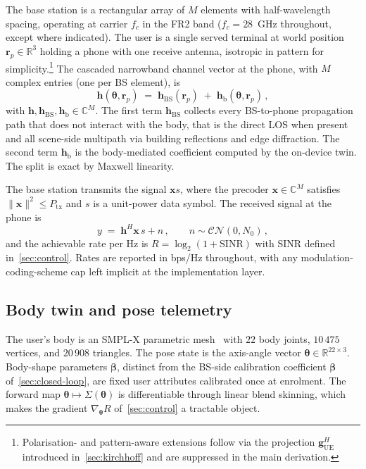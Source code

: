 \documentclass[journal,twocolumn,10pt]{IEEEtran}
\theoremstyle{plain}
\theoremstyle{definition}
\theoremstyle{remark}
\newcommand{\rr}{\mathbf{r}}
\newcommand{\xx}{\mathbf{x}}
\newcommand{\hh}{\bm{h}}
\newcommand{\thetab}{\bm{\theta}}
\newcommand{\betab}{\bm{\beta}}
\newcommand{\hBS}{\bm{h}_{\mathrm{BS}}}
\newcommand{\hbody}{\bm{h}_{\mathrm{b}}}
\newcommand{\Complex}{\mathbb{C}}
\newcommand{\Reals}{\mathbb{R}}
\begin{document}
The base station is a rectangular array of $M$ elements with
half-wavelength spacing, operating at carrier $f_c$ in the FR2 band
($f_c = 28$~GHz throughout, except where indicated). The user is a
single served terminal at world position $\rr_p \in \Reals^{3}$
holding a phone with one receive antenna, isotropic in pattern for
simplicity.\footnote{Polarisation- and pattern-aware extensions
follow via the projection $\bm{g}_{\mathrm{UE}}^{H}$ introduced
in~\cref{sec:kirchhoff} and are suppressed in the main derivation.}
The cascaded narrowband channel vector at the phone, with $M$
complex entries (one per BS element), is
\begin{equation}\label{eq:cascaded}
\hh(\thetab,\rr_p) \;=\; \hBS(\rr_p) \;+\; \hbody(\thetab,\rr_p) \,,
\end{equation}
with $\hh,\hBS,\hbody \in \Complex^{M}$. The first term $\hBS$
collects every BS-to-phone propagation path that does not interact
with the body, that is the direct LOS when present and all
scene-side multipath via building reflections and edge diffraction.
The second term $\hbody$ is the body-mediated coefficient computed
by the on-device twin. The split is exact by Maxwell linearity.

The base station transmits the signal $\xx s$, where the precoder
$\xx \in \Complex^{M}$ satisfies $\|\xx\|^{2} \leq P_{\mathrm{tx}}$
and $s$ is a unit-power data symbol. The received signal at the
phone is
\begin{equation}\label{eq:rx}
y \;=\; \hh^{H} \xx \, s + n \,, \qquad n \sim \mathcal{CN}(0, N_{0}) \,,
\end{equation}
and the achievable rate per Hz is $R = \log_{2}(1 + \mathrm{SINR})$
with SINR defined in~\cref{sec:control}. Rates are reported in
bps/Hz throughout, with any modulation-coding-scheme cap left
implicit at the implementation layer.

\subsection{Body twin and pose telemetry}

The user's body is an SMPL-X parametric
mesh~\cite{SMPLX2019} with $22$ body joints, $10\,475$ vertices,
and $20\,908$ triangles. The pose state is the axis-angle vector
$\thetab \in \Reals^{22 \times 3}$. Body-shape parameters
$\bm{\beta}$, distinct from the BS-side calibration coefficient
$\betab$ of~\cref{sec:closed-loop}, are fixed user attributes
calibrated once at enrolment. The forward map $\thetab \mapsto
\Sigma(\thetab)$ is differentiable through linear blend skinning,
which makes the gradient $\nabla_{\thetab} R$
of~\cref{sec:control} a tractable object.
\end{document}
